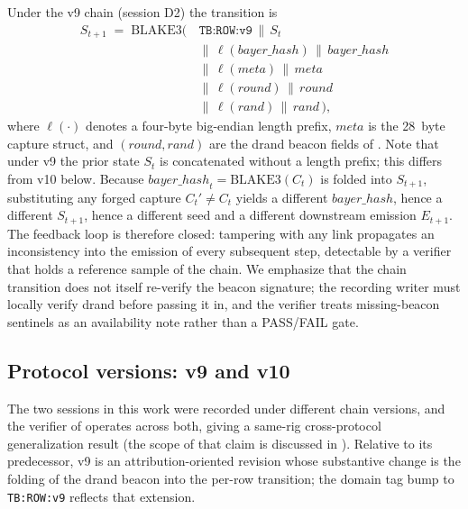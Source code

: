 Under the v9 chain (session D2) the transition is
\begin{equation}
\begin{aligned}
S_{t+1} \;=\; \mathrm{BLAKE3}\big(\,&\texttt{TB:ROW:v9}\,\|\,S_t\\
&\|\,\ell(\mathit{bayer\_hash})\,\|\,\mathit{bayer\_hash}\\
&\|\,\ell(\mathit{meta})\,\|\,\mathit{meta}\\
&\|\,\ell(\mathit{round})\,\|\,\mathit{round}\\
&\|\,\ell(\mathit{rand})\,\|\,\mathit{rand}\,\big),
\end{aligned}
\label{eq:pc_v9}
\end{equation}
where $\ell(\cdot)$ denotes a four-byte big-endian length prefix, $\mathit{meta}$ is the \SI{28}{byte} capture struct, and $(\mathit{round}, \mathit{rand})$ are the drand beacon fields of . Note that under v9 the prior state $S_t$ is concatenated without a length prefix; this differs from v10 below. Because $\mathit{bayer\_hash}_t = \mathrm{BLAKE3}(C_t)$ is folded into $S_{t+1}$, substituting any forged capture $C_t' \neq C_t$ yields a different $\mathit{bayer\_hash}$, hence a different $S_{t+1}$, hence a different seed and a different downstream emission $E_{t+1}$. The feedback loop is therefore closed: tampering with any link propagates an inconsistency into the emission of every subsequent step, detectable by a verifier that holds a reference sample of the chain. We emphasize that the chain transition does not itself re-verify the beacon signature; the recording writer must locally verify drand before passing it in, and the verifier treats missing-beacon sentinels as an availability note rather than a PASS/FAIL gate.

\subsection{Protocol versions: v9 and v10}
\label{subsec:pc_versions}

The two sessions in this work were recorded under different chain versions, and the verifier of  operates across both, giving a same-rig cross-protocol generalization result (the scope of that claim is discussed in ). Relative to its predecessor, v9 is an attribution-oriented revision whose substantive change is the folding of the drand beacon into the per-row transition; the domain tag bump to \texttt{TB:ROW:v9} reflects that extension.

